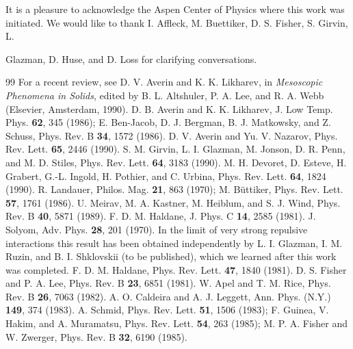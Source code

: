 \documentclass[11pt]{article}
\begin{document}
It is a pleasure to acknowledge the Aspen Center of Physics where this work was initiated. We would like to thank I. Affleck, M. Buettiker, D. S. Fisher, S. Girvin, L.

Glazman, D. Huse, and D. Loss for clarifying conversations.

\begin{thebibliography}{99}
 For a recent review, see D. V. Averin and K. K. Likharev, in \textit{Mesoscopic Phenomena in Solids}, edited by B. L. Altshuler, P. A. Lee, and R. A. Webb (Elsevier, Amsterdam, 1990).
 D. B. Averin and K. K. Likharev, J. Low Temp. Phys. \textbf{62}, 345 (1986); E. Ben-Jacob, D. J. Bergman, B. J. Matkowsky, and Z. Schuss, Phys. Rev. B \textbf{34}, 1572 (1986).
 D. V. Averin and Yu. V. Nazarov, Phys. Rev. Lett. \textbf{65}, 2446 (1990).
 S. M. Girvin, L. I. Glazman, M. Jonson, D. R. Penn, and M. D. Stiles, Phys. Rev. Lett. \textbf{64}, 3183 (1990).
 M. H. Devoret, D. Esteve, H. Grabert, G.-L. Ingold, H. Pothier, and C. Urbina, Phys. Rev. Lett. \textbf{64}, 1824 (1990).
 R. Landauer, Philos. Mag. \textbf{21}, 863 (1970); M. Büttiker, Phys. Rev. Lett. \textbf{57}, 1761 (1986).
 U. Meirav, M. A. Kastner, M. Heiblum, and S. J. Wind, Phys. Rev. B \textbf{40}, 5871 (1989).
 F. D. M. Haldane, J. Phys. C \textbf{14}, 2585 (1981).
 J. Solyom, Adv. Phys. \textbf{28}, 201 (1970).
 In the limit of very strong repulsive interactions this result has been obtained independently by L. I. Glazman, I. M. Ruzin, and B. I. Shklovskii (to be published), which we learned after this work was completed.
 F. D. M. Haldane, Phys. Rev. Lett. \textbf{47}, 1840 (1981).
 D. S. Fisher and P. A. Lee, Phys. Rev. B \textbf{23}, 6851 (1981).
 W. Apel and T. M. Rice, Phys. Rev. B \textbf{26}, 7063 (1982).
 A. O. Caldeira and A. J. Leggett, Ann. Phys. (N.Y.) \textbf{149}, 374 (1983).
 A. Schmid, Phys. Rev. Lett. \textbf{51}, 1506 (1983); F. Guinea, V. Hakim, and A. Muramatsu, Phys. Rev. Lett. \textbf{54}, 263 (1985); M. P. A. Fisher and W. Zwerger, Phys. Rev. B \textbf{32}, 6190 (1985).
\end{thebibliography}
\end{document}
